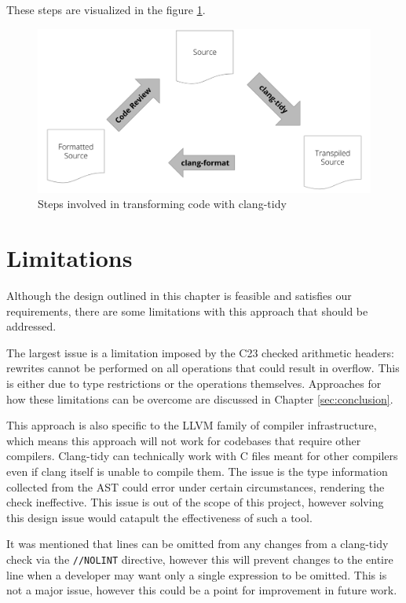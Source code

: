 These steps are visualized in the figure \ref{figure:clang-tidy}.

\begin{figure}
    \centering
        \includegraphics[width=1\textwidth]{source/Pictures/Screenshot 2025-04-25 122441.png}
        \caption{Steps involved in transforming code with clang-tidy}
        \label{figure:clang-tidy}
\end{figure}

\section{Limitations}

Although the design outlined in this chapter is feasible and satisfies our requirements, there are some limitations with this approach that should be addressed.

The largest issue is a limitation imposed by the C23 checked arithmetic headers: rewrites cannot be performed on all operations that could result in overflow. This is either due to type restrictions or the operations themselves. Approaches for how these limitations can be overcome are discussed in Chapter \ref{sec:conclusion}.

This approach is also specific to the LLVM family of compiler infrastructure, which means this approach will not work for codebases that require other compilers. Clang-tidy can technically work with C files meant for other compilers even if clang itself is unable to compile them. The issue is the type information collected from the AST could error under certain circumstances, rendering the check ineffective. This issue is out of the scope of this project, however solving this design issue would catapult the effectiveness of such a tool.

It was mentioned that lines can be omitted from any changes from a clang-tidy check via the \texttt{//NOLINT} directive, however this will prevent changes to the entire line when a developer may want only a single expression to be omitted. This is not a major issue, however this could be a point for improvement in future work.

